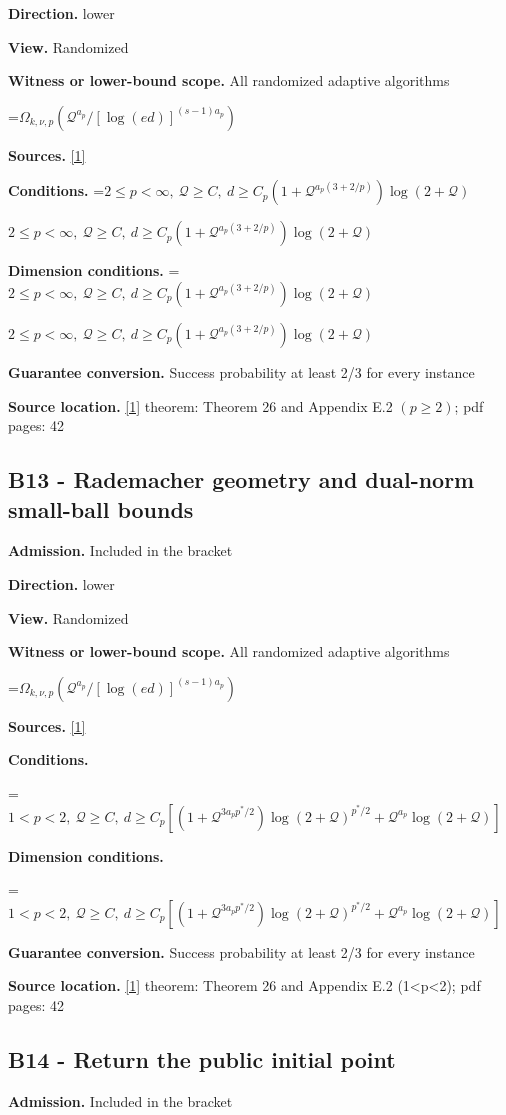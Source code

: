 \documentclass[10pt,a4paper]{article}
\newcommand{\AtlasMath}[1]{\par\begingroup\centering\setbox0=\hbox{$\displaystyle #1$}\ifdim\wd0>1.4\linewidth\typeout{ATLAS WIDE FORMULA: \the\wd0}\fi\ifdim\wd0>\linewidth\resizebox{\linewidth}{!}{\box0}\else\box0\fi\par\endgroup}
\newcommand{\AtlasInlineMath}[1]{\begingroup\setbox0=\hbox{$#1$}\ifdim\wd0>.4\linewidth\endgroup\AtlasMath{#1}\else\endgroup$#1$\fi}
\begin{document}
\textbf{Direction.} lower

\textbf{View.} Randomized

\textbf{Witness or lower-bound scope.} All randomized adaptive algorithms

\AtlasMath{\Omega_{k,\nu,p}(\mathcal{Q}^{a_p}/[\log(ed)]^{(s-1)a_p})}
\textbf{Sources.} \href{https://arxiv.org/pdf/2411.08987v2}{[1]}

\textbf{Conditions.} \AtlasInlineMath{2\le p<\infty,\ \mathcal{Q}\ge C,\ d\ge C_p(1+\mathcal{Q}^{a_p(3+2/p)})\log(2+\mathcal{Q})}

\textbf{Dimension conditions.} \AtlasInlineMath{2\le p<\infty,\ \mathcal{Q}\ge C,\ d\ge C_p(1+\mathcal{Q}^{a_p(3+2/p)})\log(2+\mathcal{Q})}

\textbf{Guarantee conversion.} Success probability at least 2/3 for every instance

\textbf{Source location.} \href{https://arxiv.org/pdf/2411.08987v2}{[1]} theorem: Theorem 26 and Appendix E.2 $(p\ge 2)$; pdf pages: 42

\subsection{B13 - Rademacher geometry and dual-norm small-ball bounds}
\textbf{Admission.} Included in the bracket

\textbf{Direction.} lower

\textbf{View.} Randomized

\textbf{Witness or lower-bound scope.} All randomized adaptive algorithms

\AtlasMath{\Omega_{k,\nu,p}(\mathcal{Q}^{a_p}/[\log(ed)]^{(s-1)a_p})}
\textbf{Sources.} \href{https://arxiv.org/pdf/2411.08987v2}{[1]}

\textbf{Conditions.} 
\AtlasMath{1<p<2,\ \mathcal{Q}\ge C,\ d\ge C_p[(1+\mathcal{Q}^{3a_pp^*/2})\log(2+\mathcal{Q})^{p^*/2}+\mathcal{Q}^{a_p}\log(2+\mathcal{Q})]}


\textbf{Dimension conditions.} 
\AtlasMath{1<p<2,\ \mathcal{Q}\ge C,\ d\ge C_p[(1+\mathcal{Q}^{3a_pp^*/2})\log(2+\mathcal{Q})^{p^*/2}+\mathcal{Q}^{a_p}\log(2+\mathcal{Q})]}


\textbf{Guarantee conversion.} Success probability at least 2/3 for every instance

\textbf{Source location.} \href{https://arxiv.org/pdf/2411.08987v2}{[1]} theorem: Theorem 26 and Appendix E.2 (1<p<2); pdf pages: 42

\subsection{B14 - Return the public initial point}
\textbf{Admission.} Included in the bracket
\end{document}
